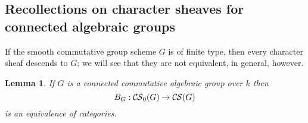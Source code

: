 \documentclass[10pt]{amsart}
\theoremstyle{plain}
\newtheorem{lemma}[theorem]{Lemma}
\theoremstyle{definition}
\newcommand{\Fq}{k}
\newcommand{\CS}{{\mathcal{C\hskip-0.8pt S}}}
\newcommand{\bCS}{{\CS_0}}
\begin{document}
\subsection{Recollections on character sheaves for connected algebraic groups}\label{ssec:connected}


If the smooth commutative group scheme $G$ is of finite type, then every character sheaf descends to $G$;
we will see that they are not equivalent, in general, however.

\begin{lemma}\label{lem:bounded_connected}
If $G$ is a connected commutative algebraic group over $\Fq$ then 
\[
B_G : \bCS(G) \to \CS(G)
\]
 is an equivalence of categories.
\end{lemma}
\end{document}
